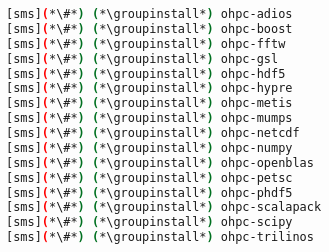 \begin{lstlisting}[language=bash,keywords={},upquote=true,keepspaces]
[sms](*\#*) (*\groupinstall*) ohpc-adios        
[sms](*\#*) (*\groupinstall*) ohpc-boost        
[sms](*\#*) (*\groupinstall*) ohpc-fftw         
[sms](*\#*) (*\groupinstall*) ohpc-gsl          
[sms](*\#*) (*\groupinstall*) ohpc-hdf5         
[sms](*\#*) (*\groupinstall*) ohpc-hypre        
[sms](*\#*) (*\groupinstall*) ohpc-metis        
[sms](*\#*) (*\groupinstall*) ohpc-mumps        
[sms](*\#*) (*\groupinstall*) ohpc-netcdf       
[sms](*\#*) (*\groupinstall*) ohpc-numpy        
[sms](*\#*) (*\groupinstall*) ohpc-openblas     
[sms](*\#*) (*\groupinstall*) ohpc-petsc        
[sms](*\#*) (*\groupinstall*) ohpc-phdf5        
[sms](*\#*) (*\groupinstall*) ohpc-scalapack    
[sms](*\#*) (*\groupinstall*) ohpc-scipy        
[sms](*\#*) (*\groupinstall*) ohpc-trilinos     
\end{lstlisting}
